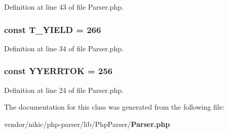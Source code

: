 Definition at line 43 of file Parser.\+php.

\subsubsection[{T\+\_\+\+Y\+I\+E\+L\+D}]{\setlength{\rightskip}{0pt plus 5cm}const T\+\_\+\+Y\+I\+E\+L\+D = 266}\label{class_php_parser_1_1_parser_a8ad3711fa281229e4ccecaf9b14de677}


Definition at line 34 of file Parser.\+php.

\subsubsection[{Y\+Y\+E\+R\+R\+T\+O\+K}]{\setlength{\rightskip}{0pt plus 5cm}const Y\+Y\+E\+R\+R\+T\+O\+K = 256}\label{class_php_parser_1_1_parser_a481a031acf57b1b6180b3f0f3f45bc26}


Definition at line 24 of file Parser.\+php.



The documentation for this class was generated from the following file\+:\begin{DoxyCompactItemize}
\item 
vendor/nikic/php-\/parser/lib/\+Php\+Parser/{\bf Parser.\+php}\end{DoxyCompactItemize}
